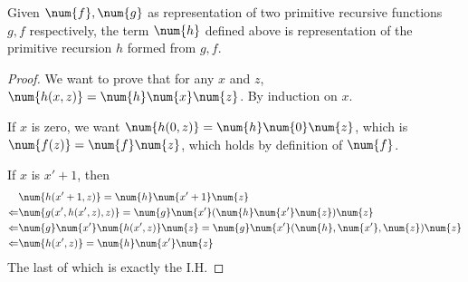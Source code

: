 \documentclass[../../../include/open-logic-section]{subfiles}
\begin{document}
\begin{lem}
  Given $\num{f},\num{g}$ as representation of two primitive recursive
  functions $g,f$ respectively, the
  term $\num{h}$ defined above is representation of the primitive
  recursion $h$ formed from $g,f$.
\end{lem}
\begin{proof}
  We want to prove that for any $x$ and $z$, $\num{h(x,z)} = \num{h}
  \num{x} \num{z}$. By induction on $x$.

  If $x$ is zero, we want $\num{h(0,z)} = \num{h} \num{0} \num{z}$,
  which is $\num{f(z)} = \num{f} \num{z}$, which holds by definition
  of $\num{f}$.
  
  If $x$ is $x'+1$, then
  \begin{align*}
    &\num{h(x'+1,z)} = \num{h} \num{x'+1} \num{z} \\
    \Leftarrow & \num{g(x',h(x',z),z)} = \num{g} \num{x'} (\num{h}
                 \num{x'} \num{z}) \num{z} \\
    \Leftarrow & \num{g} \num{x'} \num{h(x',z)} \num{z} = \num{g}
                 \num{x'} (\num{h}, \num{x'}, \num{z}) \num{z} \\
    \Leftarrow & \num{h(x',z)} = \num{h} \num{x'} \num{z}
  \end{align*}
  The last of which is exactly the I.H.
\end{proof}
\end{document}
